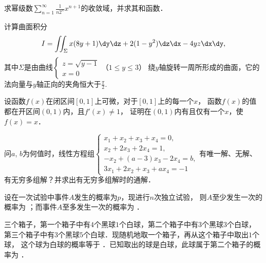 \documentclass[plain,noanswer,medmath]{../../template/jnuexam}
\begin{document}

\begin{problem}
求幂级数$\sum_{n = 1}^{\infty}\frac{1}{n2^n}x^{n + 1}$的收敛域，并求其和函数．
\end{problem}



\begin{problem}
计算曲面积分
$$I = \iint_{\Sigma}x(8y + 1)\dy\dz + 2(1 - y^2)\dz\dx - 4yz\dx\dy,$$
其中$\Sigma$是由曲线$\begin{cases}
  z = \sqrt{y - 1} \\
  x = 0
\end{cases}$（$1 \le y \le 3$）
绕$y$轴旋转一周所形成的曲面，它的法向量与$y$轴正向的夹角恒大于$\frac{\pi}{2}.$
\end{problem}



\begin{problem}
设函数$f(x)$在闭区间$[0,1]$上可微，对于$[0,1]$上的每一个$x$，
函数$f(x)$的值都在开区间$(0,1)$内，且$f'(x) \ne 1$，
证明在$(0,1)$内有且仅有一个$x$，使$f(x) = x$．
\end{problem}



\begin{problem}
问$a$, $b$为何值时，线性方程组$\begin{cases}
  x_1 + x_2 + x_3 + x_4 = 0, \\
  x_2 + 2x_3 + 2x_4 = 1, \\
  -x_2 + (a - 3)x_3 - 2x_4 = b, \\
  3x_1 + 2x_2 + x_3 + ax_4 = - 1
\end{cases}$有唯一解、无解、有无穷多组解？并求出有无穷多组解时的通解．
\end{problem}




\begin{problem}
设在一次试验中事件$A$发生的概率为$p$，现进行$n$次独立试验，
则$A$至少发生一次的概率为 \fillin{}；而事件$A$至多发生一次的概率为 \fillin{}．
\end{problem}


\begin{problem}
三个箱子，第一个箱子中有$4$个黑球$1$个白球，第二个箱子中有$3$个黑球$3$个白球，
第三个箱子中有$3$个黑球$5$个白球．现随机地取一个箱子，再从这个箱子中取出$1$个球，
这个球为白球的概率等于 \fillin{}．已知取出的球是白球，此球属于第二个箱子的概率为 \fillin{}．
\end{problem}
\end{document}
